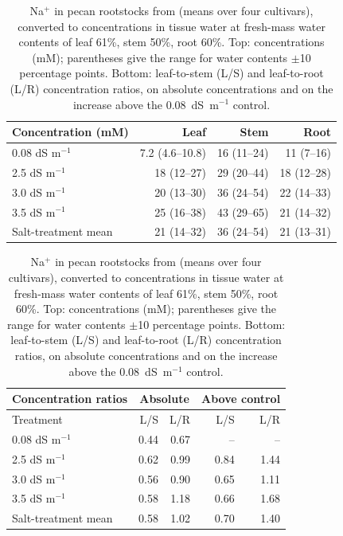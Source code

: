 \begin{table}[htbp]
\centering
\small
\caption{Na$^+$ in pecan rootstocks from \citet{CamposVillarreal2017} (means over four cultivars), converted to concentrations in tissue water at fresh-mass water contents of leaf 61\%, stem 50\%, root 60\%. Top: concentrations (mM); parentheses give the range for water contents $\pm$10 percentage points. Bottom: leaf-to-stem (L/S) and leaf-to-root (L/R) concentration ratios, on absolute concentrations and on the increase above the 0.08~dS~m$^{-1}$ control.}
\label{tab:na_partitioning}
\begin{tabular}{lrrr}
\toprule
Concentration (mM) & Leaf & Stem & Root \\
\midrule
0.08 dS m$^{-1}$ & 7.2 (4.6--10.8) & 16 (11--24) & 11 (7--16) \\
2.5 dS m$^{-1}$ & 18 (12--27) & 29 (20--44) & 18 (12--28) \\
3.0 dS m$^{-1}$ & 20 (13--30) & 36 (24--54) & 22 (14--33) \\
3.5 dS m$^{-1}$ & 25 (16--38) & 43 (29--65) & 21 (14--32) \\
\midrule
Salt-treatment mean & 21 (14--32) & 36 (24--54) & 21 (13--31) \\
\bottomrule
\end{tabular}
\par\medskip
\begin{tabular}{lrrrr}
\toprule
Concentration ratios & \multicolumn{2}{c}{Absolute} & \multicolumn{2}{c}{Above control} \\
\midrule
Treatment & L/S & L/R & L/S & L/R \\
\midrule
0.08 dS m$^{-1}$ & 0.44 & 0.67 & -- & -- \\
2.5 dS m$^{-1}$ & 0.62 & 0.99 & 0.84 & 1.44 \\
3.0 dS m$^{-1}$ & 0.56 & 0.90 & 0.65 & 1.11 \\
3.5 dS m$^{-1}$ & 0.58 & 1.18 & 0.66 & 1.68 \\
\midrule
Salt-treatment mean & 0.58 & 1.02 & 0.70 & 1.40 \\
\bottomrule
\end{tabular}
\end{table}
